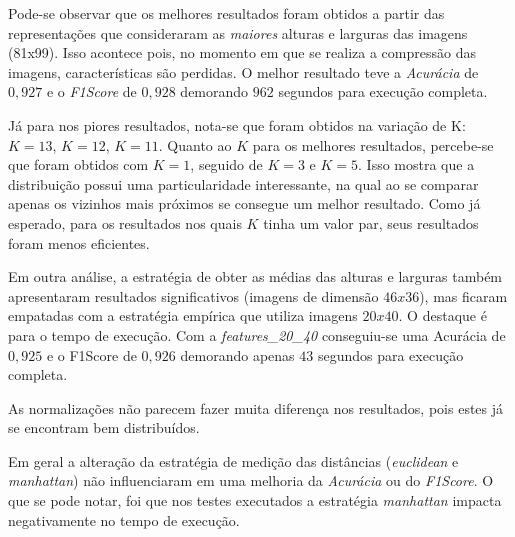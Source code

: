\documentclass[12pt]{article}
\begin{document}
Pode-se observar que os melhores resultados foram obtidos a partir das representações que consideraram as \textit{maiores} alturas e larguras das imagens (81x99). Isso acontece pois, no momento em que se realiza a compressão das imagens, características são perdidas. O melhor resultado teve a \textit{Acurácia} de $0,927$ e o \textit{F1Score} de $0,928$ demorando $962$ segundos para execução completa.

Já para nos piores resultados, nota-se que foram obtidos na variação de K: $K=13$, $K=12$, $K=11$. Quanto ao $K$ para os melhores resultados, percebe-se que foram obtidos com $K=1$, seguido de $K=3$ e $K=5$. Isso mostra que a distribuição possui uma particularidade interessante, na qual ao se comparar apenas os vizinhos mais próximos se consegue um melhor resultado. Como já esperado, para os resultados nos quais $K$ tinha um valor par, seus resultados foram menos eficientes.

Em outra análise, a estratégia de obter as médias das alturas e larguras também apresentaram resultados significativos (imagens de dimensão $46x36$), mas ficaram empatadas com a estratégia empírica que utiliza imagens $20x40$. O destaque é para o tempo de execução. Com a \textit{features\_20\_40} conseguiu-se uma Acurácia de $0,925$ e o F1Score de $0,926$ demorando apenas $43$ segundos para execução completa.

As normalizações não parecem fazer muita diferença nos resultados, pois estes já se encontram bem distribuídos.

Em geral a alteração da estratégia de medição das distâncias (\textit{euclidean} e \textit{manhattan}) não influenciaram em uma melhoria da \textit{Acurácia} ou do \textit{F1Score}. O que se pode notar, foi que nos testes executados a estratégia \textit{manhattan} impacta negativamente no tempo de execução.
\end{document}
